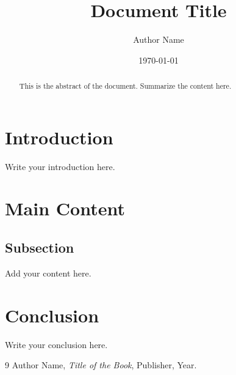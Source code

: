 \documentclass[12pt]{article}
\title{Document Title}
\author{Author Name}
\date{\today}
\begin{document}
\maketitle

\begin{abstract}
This is the abstract of the document. Summarize the content here.
\end{abstract}

\section{Introduction}
Write your introduction here.

\section{Main Content}
\subsection{Subsection}
Add your content here.

\section{Conclusion}
Write your conclusion here.

\begin{thebibliography}{9}
 Author Name, \textit{Title of the Book}, Publisher, Year.
\end{thebibliography}
\end{document}
